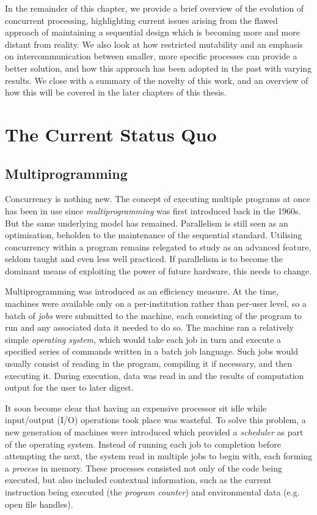 In the remainder of this chapter, we provide a brief overview of the
evolution of concurrent processing, highlighting current issues
arising from the flawed approach of maintaining a sequential design
which is becoming more and more distant from reality.  We also look at
how restricted mutability and an emphasis on intercommunication
between smaller, more specific processes can provide a better
solution, and how this approach has been adopted in the past with
varying results.  We close with a summary of the novelty of this work,
and an overview of how this will be covered in the later chapters of
this thesis.

\section{The Current Status Quo}

\subsection{Multiprogramming}

Concurrency is nothing new.  The concept of executing multiple
programs at once has been in use since \emph{multiprogramming} was
first introduced back in the 1960s.  But the same underlying model has
remained.  Parallelism is still seen as an optimisation, beholden to
the maintenance of the sequential standard.  Utilising concurrency
within a program remains relegated to study as an advanced feature,
seldom taught and even less well practiced.  If parallelism is to
become the dominant means of exploiting the power of future hardware,
this needs to change.

Multiprogramming was introduced as an efficiency measure.  At the
time, machines were available only on a per-institution rather than
per-user level, so a batch of \emph{jobs} were submitted to the
machine, each consisting of the program to run and any associated data
it needed to do so.  The machine ran a relatively simple
\emph{operating system}, which would take each job in turn and execute
a specified series of commands written in a batch job language.  Such
jobs would usually consist of reading in the program, compiling it if
necessary, and then executing it.  During execution, data was read in
and the results of computation output for the user to later digest.

It soon become clear that having an expensive processor sit idle while
input/output (I/O) operations took place was wasteful.  To solve this
problem, a new generation of machines were introduced which provided a
\emph{scheduler} as part of the operating system.  Instead of running
each job to completion before attempting the next, the system read in
multiple jobs to begin with, each forming a \emph{process} in memory.
These processes consisted not only of the code being executed, but
also included contextual information, such as the current instruction
being executed (the \emph{program counter}) and environmental data
(e.g. open file handles).

